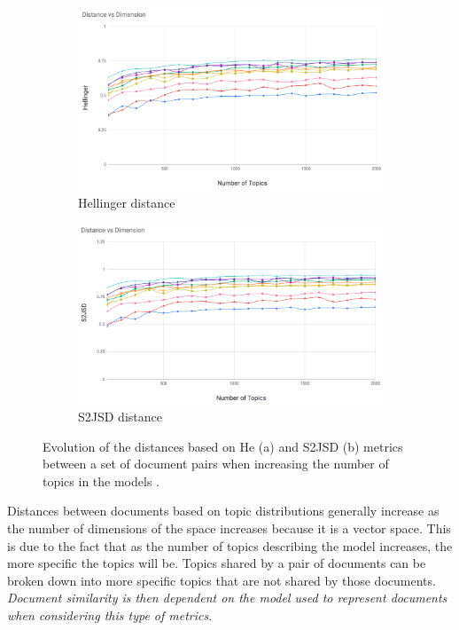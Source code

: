 \begin{figure}[]
\begin{subfigure}[b]{1.0\linewidth}
\centering
\includegraphics[width=\linewidth]{He_100_2k.png}
\caption{Hellinger distance}
\vspace{4ex}
\end{subfigure}
\begin{subfigure}[b]{1.0\linewidth}
\centering
\includegraphics[width=\linewidth]{S2JSD_100_2k.png}
\caption{S2JSD distance}
\vspace{4ex}
\end{subfigure}
\caption{Evolution of the distances based on He (a) and S2JSD (b) metrics between a set of document pairs when increasing the number of topics in the models  \citep{Badenes-Olmedo2020}.}
\label{fig:topic_distances2}
\end{figure}


Distances between documents based on topic distributions generally increase as the number of dimensions of the space increases because it is a vector space. This is due to the fact that as the number of topics describing the model increases, the more specific the topics will be. Topics shared by a pair of documents can be broken down into more specific topics that are not shared by those documents. \textit{Document similarity is then dependent on the model used to represent documents when considering this type of metrics}. 


